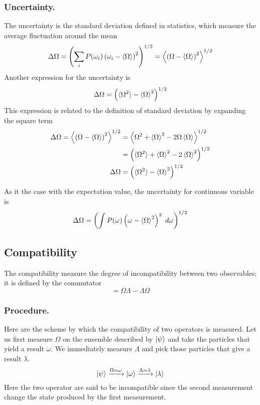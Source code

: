 \documentclass[../../../main.tex]{subfiles}
\begin{document}
\subsubsection{Uncertainty.}
The uncertainty is the standard deviation defined in statistics, which measure the average fluctuation around the mean 
\begin{equation*}
    \Delta\Omega=\left(\sum_i P(\omega_i)\left( \omega_i -\braket{\Omega} \right)^2 \right)^{1/2}=\left\langle \left( \Omega-\braket{\Omega} \right)^2 \right\rangle  ^{1/2}
\end{equation*}
Another expression for the uncertainty is 
\begin{equation*}
    \Delta\Omega=\left( \braket{\Omega^2}-\braket{\Omega}^2 \right) ^{1/2}
\end{equation*}
This expression is related to the definition of standard deviation by expanding the square term 
\begin{align*}
    \Delta\Omega=\left\langle \left( \Omega-\braket{\Omega} \right)^2 \right\rangle  ^{1/2} &= \left\langle \Omega^2+\braket{\Omega}^2-2\Omega \braket{\Omega } \right\rangle^{1/2}\\
    &= \left( \braket{\Omega^2}+\braket{\Omega}^2-2 \braket{\Omega}^2 \right) ^{1/2}\\
    \Delta\Omega &= \left( \braket{\Omega^2}-\braket{\Omega}^2 \right) ^{1/2}
\end{align*} 

As it the case with the expectation value, the uncertainty for continuous variable is 
\begin{equation*}
    \Delta\Omega=\left( \int P(\omega)\left( \omega-\braket{\Omega}^2 \right)^2  \;d \omega\right) ^{1/2}
\end{equation*} 

\subsection{Compatibility}
The compatibility measure the degree of incompatibility between two observables; it is defined by the commutator
\begin{equation*}
    [\Omega\Lambda]=\Omega\Lambda-\Lambda\Omega
\end{equation*}

\subsubsection{Procedure.}
Here are the scheme by which the compatibility of two operators is measured.
Let us first measure $\Omega$ on the ensemble described by $\ket{\psi}$ and take the particles that yield a result $\omega$. 
We immediately measure $\Lambda$ and pick those particles that give a result $\lambda$.
\begin{equation*}
    \ket{\psi}\xrightarrow{\Omega=\omega}\ket{\omega}\xrightarrow{\Lambda=\lambda}\ket{\lambda}
\end{equation*}
Here the two operator are said to be incompatible since the second measurement change the state produced by the first measurement.
\end{document}
